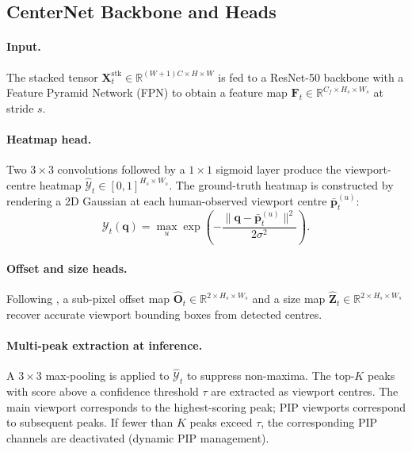 \documentclass[preprint,12pt]{elsarticle}
\begin{document}
\subsection{CenterNet Backbone and Heads}

\paragraph{Input.} The stacked tensor 
$\mathbf{X}^{\text{stk}}_t \in \mathbb{R}^{(W+1)C \times H \times W}$ is 
fed to a ResNet-50 \cite{he2016deep} backbone with a Feature Pyramid Network 
(FPN) \cite{lin2017feature} to obtain a feature map 
$\mathbf{F}_t \in \mathbb{R}^{C_f \times H_s \times W_s}$ at stride $s$.

\paragraph{Heatmap head.} Two $3{\times}3$ convolutions followed by a 
$1{\times}1$ sigmoid layer produce the viewport-centre heatmap 
$\hat{\mathcal{Y}}_t \in [0,1]^{H_s \times W_s}$. The ground-truth heatmap 
is constructed by rendering a 2D Gaussian at each human-observed viewport 
centre $\bar{\mathbf{p}}^{(u)}_t$:
\begin{equation}
  \mathcal{Y}_t(\mathbf{q}) = 
    \max_u \exp\!\left(-\frac{\|\mathbf{q} - \bar{\mathbf{p}}^{(u)}_t\|^2}
                              {2\sigma^2}\right).
  \label{eq:gt_heatmap}
\end{equation}

\paragraph{Offset and size heads.} Following \cite{zhou2019objects}, 
a sub-pixel offset map $\hat{\mathbf{O}}_t \in \mathbb{R}^{2 \times H_s 
\times W_s}$ and a size map $\hat{\mathbf{Z}}_t \in \mathbb{R}^{2 \times 
H_s \times W_s}$ recover accurate viewport bounding boxes from detected 
centres.

\paragraph{Multi-peak extraction at inference.} A $3{\times}3$ max-pooling 
is applied to $\hat{\mathcal{Y}}_t$ to suppress non-maxima. The top-$K$ 
peaks with score above a confidence threshold $\tau$ are extracted as 
viewport centres. The main viewport corresponds to the highest-scoring peak; 
PIP viewports correspond to subsequent peaks. If fewer than $K$ peaks exceed 
$\tau$, the corresponding PIP channels are deactivated (dynamic PIP 
management).
\end{document}
